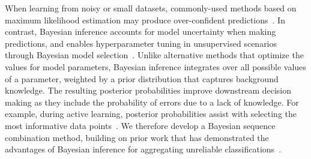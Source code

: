 When learning from noisy or small datasets, commonly-used
methods based on maximum likelihood estimation may produce over-confident predictions~\cite{xiong2011bayesian,srivastava2014dropout}. 
In contrast, Bayesian inference accounts for model uncertainty when making predictions,
and enables hyperparameter tuning in unsupervised scenarios through Bayesian model selection~\cite{Bishop2006}. 
Unlike alternative methods that optimize the values for model parameters, Bayesian inference
integrates over all possible values of a parameter, weighted by a prior distribution that captures background knowledge.
The resulting posterior probabilities improve downstream decision making
as they include the probability of errors due to a lack of knowledge. For example, 
during active learning, posterior probabilities assist with selecting the most informative data points~\cite{settles2010active}.
We therefore develop a Bayesian sequence combination method, building on prior work that has demonstrated the advantages of Bayesian inference for aggregating unreliable classifications~\cite{kim2012bayesian,simpsonlong,Felt2016SemanticAA,paun2018comparing}. 



